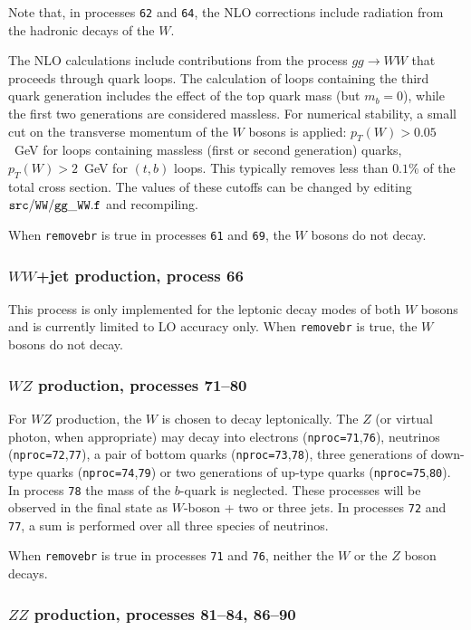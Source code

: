 \documentclass[12pt]{article}
\begin{document}
Note that, in processes
{\tt 62} and {\tt 64}, the NLO corrections include radiation from the
hadronic decays of the $W$.

The NLO calculations include contributions from the process $gg \to WW$
that proceeds through quark loops. The calculation of loops containing the third quark generation
includes the effect of the top quark mass (but $m_b=0$), while the first two
generations are considered massless. For numerical stability, a small cut on the
transverse momentum of the $W$ bosons is applied: $p_T(W)>0.05$~GeV for loops
containing massless (first or second generation) quarks, $p_T(W)>2$~GeV for $(t,b)$
loops. This typically removes less than $0.1$\% of the total cross section. The
values of these cutoffs can be changed by editing ${\tt src/WW/gg\_WW.f}$ and recompiling.

When {\tt removebr} is true in processes {\tt 61} and {\tt 69},
the $W$ bosons do not decay.

\subsubsection{$WW$+jet production, process 66}

This process is only implemented for the leptonic decay modes of both $W$
bosons and is currently limited to LO accuracy only. When {\tt removebr} is true,
the $W$ bosons do not decay.

\subsubsection{$WZ$ production, processes 71--80}

For $WZ$ production, the $W$ is chosen to decay leptonically. The $Z$ (or
virtual photon, when appropriate) may decay into electrons
({\tt nproc=71},{\tt 76}), neutrinos ({\tt nproc=72},{\tt 77}), a
pair of bottom quarks ({\tt nproc=73},{\tt 78}), three generations of down-type
quarks ({\tt nproc=74},{\tt 79}) or two generations of up-type quarks ({\tt nproc=75},{\tt 80}).
In process {\tt 78} the mass of the $b$-quark is neglected.
These processes will be observed
in the final state as $W$-boson + two or three jets.
In processes {\tt 72} and {\tt 77}, a sum is performed over all three species of neutrinos.

When {\tt removebr} is true in processes {\tt 71} and {\tt 76},
neither the $W$ or the $Z$ boson decays.

\subsubsection{$ZZ$ production, processes 81--84, 86--90}
\end{document}
